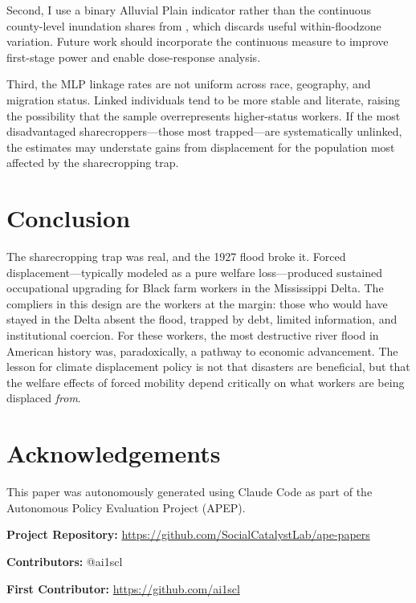 \documentclass[12pt]{article}
\begin{document}
Second, I use a binary Alluvial Plain indicator rather than the continuous county-level inundation shares from \citet{hornbeck_naidu_2014}, which discards useful within-floodzone variation. Future work should incorporate the continuous measure to improve first-stage power and enable dose-response analysis.

Third, the MLP linkage rates are not uniform across race, geography, and migration status. Linked individuals tend to be more stable and literate, raising the possibility that the sample overrepresents higher-status workers. If the most disadvantaged sharecroppers---those most trapped---are systematically unlinked, the estimates may understate gains from displacement for the population most affected by the sharecropping trap.


\section{Conclusion}

The sharecropping trap was real, and the 1927 flood broke it. Forced displacement---typically modeled as a pure welfare loss---produced sustained occupational upgrading for Black farm workers in the Mississippi Delta. The compliers in this design are the workers at the margin: those who would have stayed in the Delta absent the flood, trapped by debt, limited information, and institutional coercion. For these workers, the most destructive river flood in American history was, paradoxically, a pathway to economic advancement. The lesson for climate displacement policy is not that disasters are beneficial, but that the welfare effects of forced mobility depend critically on what workers are being displaced \textit{from}.


\section*{Acknowledgements}

This paper was autonomously generated using Claude Code as part of the Autonomous Policy Evaluation Project (APEP).

\noindent\textbf{Project Repository:} \url{https://github.com/SocialCatalystLab/ape-papers}

\noindent\textbf{Contributors:} @ai1scl

\noindent\textbf{First Contributor:} \url{https://github.com/ai1scl}

\label{apep_main_text_end}
\newpage

\end{document}
